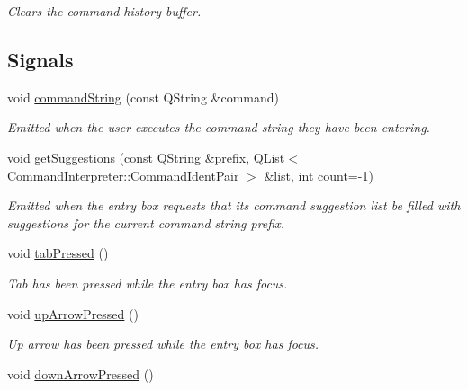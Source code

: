 \begin{DoxyCompactItemize}
\begin{DoxyCompactList}\small\item\em Clears the command history buffer. \end{DoxyCompactList}\end{DoxyCompactItemize}
\subsection*{Signals}
\begin{DoxyCompactItemize}
\item 
void \hyperlink{class_command_entry_box_ac3a24b4e68ffd823d14c37b212290fa3}{command\-String} (const Q\-String \&command)
\begin{DoxyCompactList}\small\item\em Emitted when the user executes the command string they have been entering. \end{DoxyCompactList}\item 
void \hyperlink{class_command_entry_box_a926587c4199c009a85daec24624968f4}{get\-Suggestions} (const Q\-String \&prefix, Q\-List$<$ \hyperlink{class_command_interpreter_acef7360cdc3e98c4d35ec54954c4e39c}{Command\-Interpreter\-::\-Command\-Ident\-Pair} $>$ \&list, int count=-\/1)
\begin{DoxyCompactList}\small\item\em Emitted when the entry box requests that its command suggestion list be filled with suggestions for the current command string prefix. \end{DoxyCompactList}\item 
\hypertarget{class_command_entry_box_a2808bdf010ef238092b3cc3c050cbfdb}{void \hyperlink{class_command_entry_box_a2808bdf010ef238092b3cc3c050cbfdb}{tab\-Pressed} ()}\label{class_command_entry_box_a2808bdf010ef238092b3cc3c050cbfdb}

\begin{DoxyCompactList}\small\item\em Tab has been pressed while the entry box has focus. \end{DoxyCompactList}\item 
\hypertarget{class_command_entry_box_a5759602d5713c0f2f7fb9f68c5f7c507}{void \hyperlink{class_command_entry_box_a5759602d5713c0f2f7fb9f68c5f7c507}{up\-Arrow\-Pressed} ()}\label{class_command_entry_box_a5759602d5713c0f2f7fb9f68c5f7c507}

\begin{DoxyCompactList}\small\item\em Up arrow has been pressed while the entry box has focus. \end{DoxyCompactList}\item 
\hypertarget{class_command_entry_box_abd5ca1d5f1eb6d5d5c1b5174d9cdf5fb}{void \hyperlink{class_command_entry_box_abd5ca1d5f1eb6d5d5c1b5174d9cdf5fb}{down\-Arrow\-Pressed} ()}\label{class_command_entry_box_abd5ca1d5f1eb6d5d5c1b5174d9cdf5fb}


\end{DoxyCompactItemize}
